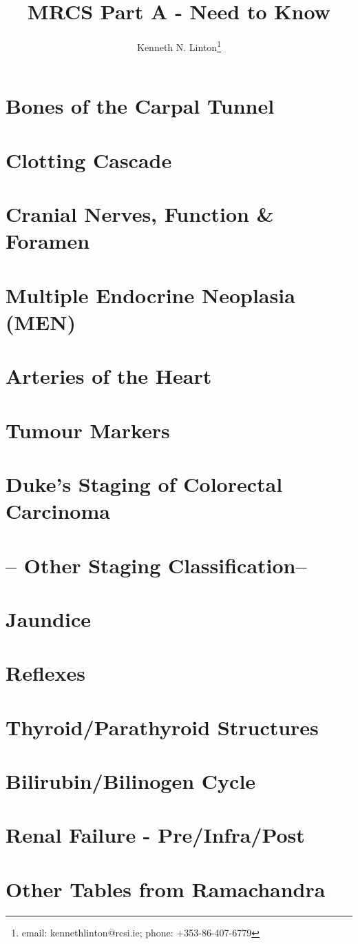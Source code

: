 \documentclass[12pt, a4paper]{article}
\title{MRCS Part A - Need to Know}
\author{Kenneth N. Linton\thanks{email: kennethlinton@rcsi.ie; phone: +353-86-407-6779}}
\begin{document}
\maketitle

\section{Bones of the Carpal Tunnel}
\section{Clotting Cascade}
\section{Cranial Nerves, Function & Foramen}
\section{Multiple Endocrine Neoplasia (MEN)}
\section{Arteries of the Heart}
\section{Tumour Markers}
\section{Duke's Staging of Colorectal Carcinoma}
\section{-- Other Staging Classification--}
\section{Jaundice}
\section{Reflexes}
\section{Thyroid/Parathyroid Structures}
\section{Bilirubin/Bilinogen Cycle}
\section{Renal Failure - Pre/Infra/Post}
\section{Other Tables from Ramachandra}

\end{document}
